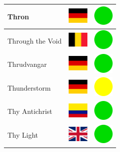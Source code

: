 \documentclass[12pt, a4paper, twoside]{report}
\begin{document}
\begin{center}
\begin{longtable}{|p{5cm}|p{2cm}|p{2cm}|}
 Thron                                                      & \includegraphics[width=1cm]{../img/flags/de} &   \includegraphics[width=1cm]{../likes/y} \\ \hline
 Through the Void                                           & \includegraphics[width=1cm]{../img/flags/be} &   \includegraphics[width=1cm]{../likes/y} \\ \hline
 Thrudvangar                                                & \includegraphics[width=1cm]{../img/flags/de} &   \includegraphics[width=1cm]{../likes/y} \\ \hline
 Thunderstorm                                               & \includegraphics[width=1cm]{../img/flags/de} &   \includegraphics[width=1cm]{../likes/m} \\ \hline
 Thy Antichrist                                             & \includegraphics[width=1cm]{../img/flags/co} &   \includegraphics[width=1cm]{../likes/y} \\ \hline
 Thy Light                                                  & \includegraphics[width=1cm]{../img/flags/gb} &   \includegraphics[width=1cm]{../likes/y} \\ \hline

\end{longtable}
\end{center}
\end{document}
